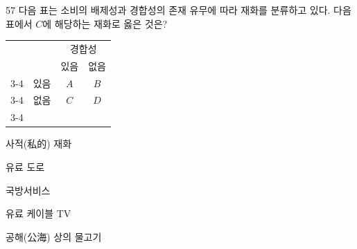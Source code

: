 \begin{question}{57}
다음 표는 소비의 배제성과 경합성의 존재 유무에 따라 재화를 분류하고 있다. 다음 표에서 $C$에 해당하는 재화로 옳은 것은?
\par{\small\centering\begin{tabular}{cc|c|c|}
\multicolumn{2}{c}{} & \multicolumn{2}{c}{경합성} \\
\multicolumn{2}{c}{} & 있음 & 없음 \\ \cline{3-4}
\multirow{2}{*}{배제성} & 있음 & $A$ & $B$ \\ \cline{3-4}
 & 없음 & $C$ & $D$ \\ \cline{3-4}
\end{tabular}\par}
\begin{choices}
  \item 사적(私的) 재화
  \item 유료 도로
  \item 국방서비스
  \item 유료 케이블 TV
  \item 공해(公海) 상의 물고기
\end{choices}
\end{question}
